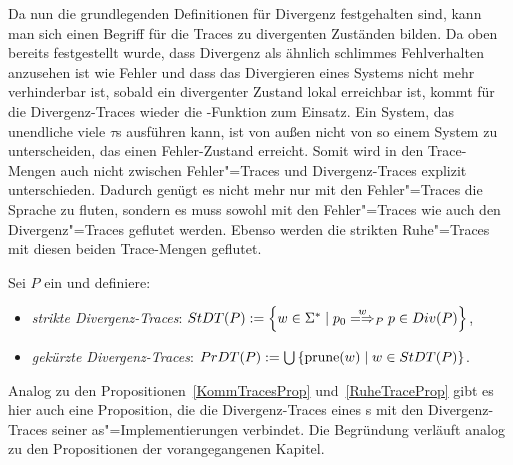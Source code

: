 Da nun die grundlegenden Definitionen für Divergenz festgehalten sind, kann man
sich einen Begriff für die Traces zu divergenten Zuständen bilden. Da oben
bereits festgestellt wurde, dass Divergenz als ähnlich \glqq schlimmes
Fehlverhalten\grqq{} anzusehen ist wie Fehler und dass das Divergieren eines
Systems nicht mehr verhinderbar ist, sobald ein divergenter Zustand lokal
erreichbar ist, kommt für die Divergenz-Traces wieder die \prune{}-Funktion zum
Einsatz. Ein System, das unendliche viele $\tau$s ausführen kann, ist von außen
nicht von so einem System zu unterscheiden, das einen Fehler-Zustand erreicht.
Somit wird in den Trace-Mengen auch nicht zwischen Fehler"=Traces und
Divergenz-Traces explizit unterschieden. Dadurch genügt es nicht mehr nur mit
den Fehler"=Traces die Sprache zu fluten, sondern es muss sowohl mit den
Fehler"=Traces wie auch den Divergenz"=Traces geflutet werden. Ebenso werden
die strikten Ruhe"=Traces mit diesen beiden Trace-Mengen geflutet.

\begin{Def}
  Sei $P$ ein \MEIO{} und definiere:
  \begin{itemize}
    \item \emph{strikte Divergenz-Traces}: $\StDT (P) := \left\{w\in\Sigma
      ^*\mid p_0\weakmay[w]_P p\in Div(P)\right\}$,
    \item \emph{gekürzte Divergenz-Traces}: $PrDT (P) := \bigcup\left\{\mathrm{prune}
      (w)\mid w\in StDT (P)\right\}$.
  \end{itemize}
\end{Def}

Analog zu den Propositionen~\ref{KommTracesProp} und~\ref{RuheTraceProp} gibt es
hier auch eine Proposition, die die Divergenz-Traces eines \MEIO{}s mit den
Divergenz-Traces seiner as"=Implementierungen verbindet. Die Begründung
verläuft analog zu den Propositionen der vorangegangenen Kapitel.

